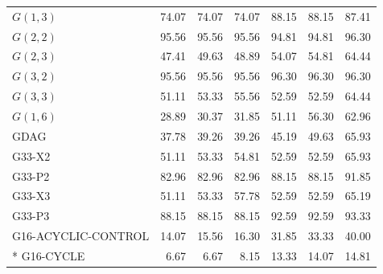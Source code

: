 \begin{longtable}{@{}lrrrrrr@{}}
\( G(1,3) \) & 74.07 & 74.07 & 74.07 & 88.15 & 88.15 & 87.41 \\
\( G(2,2) \) & 95.56 & 95.56 & 95.56 & 94.81 & 94.81 & 96.30 \\
\( G(2,3) \) & 47.41 & 49.63 & 48.89 & 54.07 & 54.81 & 64.44 \\
\( G(3,2) \) & 95.56 & 95.56 & 95.56 & 96.30 & 96.30 & 96.30 \\
\( G(3,3) \) & 51.11 & 53.33 & 55.56 & 52.59 & 52.59 & 64.44 \\
\( G(1,6) \) & 28.89 & 30.37 & 31.85 & 51.11 & 56.30 & 62.96 \\
GDAG & 37.78 & 39.26 & 39.26 & 45.19 & 49.63 & 65.93 \\
G33-X2 & 51.11 & 53.33 & 54.81 & 52.59 & 52.59 & 65.93 \\
G33-P2 & 82.96 & 82.96 & 82.96 & 88.15 & 88.15 & 91.85 \\
G33-X3 & 51.11 & 53.33 & 57.78 & 52.59 & 52.59 & 65.19 \\
G33-P3 & 88.15 & 88.15 & 88.15 & 92.59 & 92.59 & 93.33 \\
G16-ACYCLIC-CONTROL & 14.07 & 15.56 & 16.30 & 31.85 & 33.33 & 40.00 \\*
G16-CYCLE & 6.67 & 6.67 & 8.15 & 13.33 & 14.07 & 14.81 \\
\end{longtable}
\endgroup
